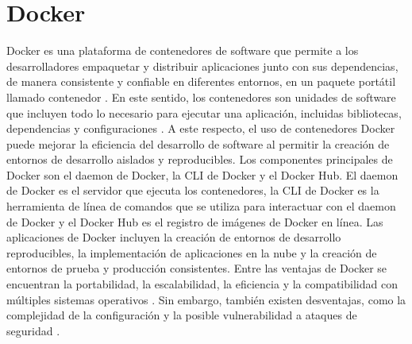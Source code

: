 \section{Docker}
Docker es una plataforma de contenedores de software que permite a los desarrolladores empaquetar y distribuir aplicaciones junto con sus dependencias, de manera consistente y confiable en diferentes entornos, en un paquete portátil llamado contenedor \cite{art:docker_containers}. En este sentido, los contenedores son unidades de software que incluyen todo lo necesario para ejecutar una aplicación, incluidas bibliotecas, dependencias y configuraciones \cite{art:docker_boettinger}. A este respecto, el uso de contenedores Docker puede mejorar la eficiencia del desarrollo de software al permitir la creación de entornos de desarrollo aislados y reproducibles. 
Los componentes principales de Docker son el daemon de Docker, la CLI de Docker y el Docker Hub. El daemon de Docker es el servidor que ejecuta los contenedores, la CLI de Docker es la herramienta de línea de comandos que se utiliza para interactuar con el daemon de Docker y el Docker Hub es el registro de imágenes de Docker en línea. Las aplicaciones de Docker incluyen la creación de entornos de desarrollo reproducibles, la implementación de aplicaciones en la nube y la creación de entornos de prueba y producción consistentes.
Entre las ventajas de Docker se encuentran la portabilidad, la escalabilidad, la eficiencia y la compatibilidad con múltiples sistemas operativos \cite{art:docker_microsoft}. Sin embargo, también existen desventajas, como la complejidad de la configuración y la posible vulnerabilidad a ataques de seguridad \cite{art:docker_microsoft}.